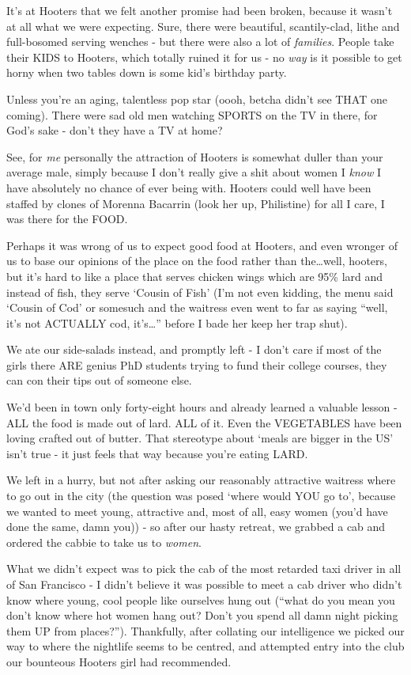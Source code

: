 \documentclass[b5paper,11pt,titlepage,draft]{book}
\begin{document}
It's at Hooters that we felt another promise had been broken, because it wasn't at all what we were expecting.  Sure, there were beautiful, scantily-clad, lithe and full-bosomed serving wenches - but there were also a lot of \emph{families}.  People take their KIDS to Hooters, which totally ruined it for us - no \emph{way} is it possible to get horny when two tables down is some kid's birthday party.

Unless you're an aging, talentless pop star (oooh, betcha didn't see THAT one coming).  There were sad old men watching SPORTS on the TV in there, for God's sake - don't they have a TV at home?

See, for \emph{me} personally the attraction of Hooters is somewhat duller than your average male, simply because I don't really give a shit about women I \emph{know} I have absolutely no chance of ever being with.  Hooters could well have been staffed by clones of Morenna Bacarrin (look her up, Philistine) for all I care, I was there for the FOOD.

Perhaps it was wrong of us to expect good food at Hooters, and even wronger of us to base our opinions of the place on the food rather than the\ldots well, hooters, but it's hard to like a place that serves chicken wings which are 95\% lard and instead of fish, they serve `Cousin of Fish' (I'm not even kidding, the menu said `Cousin of Cod' or somesuch and the waitress even went to far as saying ``well, it's not ACTUALLY cod, it's\ldots'' before I bade her keep her trap shut).

We ate our side-salads instead, and promptly left - I don't care if most of the girls there ARE genius PhD students trying to fund their college courses, they can con their tips out of someone else.

We'd been in town only forty-eight hours and already learned a valuable lesson - ALL the food is made out of lard.  ALL of it.  Even the VEGETABLES have been loving crafted out of butter.  That stereotype about `meals are bigger in the US' isn't true - it just feels that way because you're eating LARD.

We left in a hurry, but not after asking our reasonably attractive waitress where to go out in the city (the question was posed `where would YOU go to', because we wanted to meet young, attractive and, most of all, easy women (you'd have done the same, damn you)) - so after our hasty retreat, we grabbed a cab and ordered the cabbie to take us to \emph{women}.

What we didn't expect was to pick the cab of the most retarded taxi driver in all of San Francisco - I didn't believe it was possible to meet a cab driver who didn't know where young, cool people like ourselves hung out (``what do you mean you don't know where hot women hang out?  Don't you spend all damn night picking them UP from places?'').  Thankfully, after collating our intelligence we picked our way to where the nightlife seems to be centred, and attempted entry into the club our bounteous Hooters girl had recommended.
\end{document}
